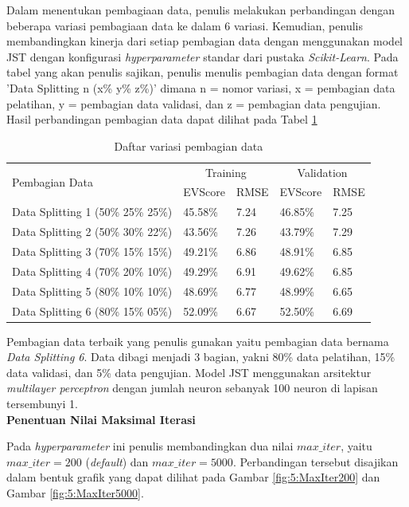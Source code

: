 Dalam menentukan pembagiaan data, penulis melakukan perbandingan dengan beberapa variasi pembagiaan data ke dalam 6 variasi. Kemudian, penulis membandingkan kinerja dari setiap pembagian data dengan menggunakan model JST dengan konfigurasi \textit{hyperparameter} standar dari pustaka \textit{Scikit-Learn}. Pada tabel yang akan penulis sajikan, penulis menulis pembagian data dengan format 'Data Splitting n (x\% y\% z\%)' dimana n = nomor variasi, x = pembagian data pelatihan, y = pembagian data validasi, dan z = pembagian data pengujian. Hasil perbandingan pembagian data dapat dilihat pada Tabel \ref{tbl:5:DataSplitting}
\begin{table}[!h]
	\caption{Daftar variasi pembagian data}
	\label{tbl:5:DataSplitting}
	\centering
	\begin{tabular}{|p{6cm}|p{1.5cm}|p{1cm}|p{1.5cm}|p{1cm}|}
		\hline
		\multirow{2}{*}{Pembagian Data } & \multicolumn{2}{|c|}{Training} & \multicolumn{2}{|c|}{Validation} \\
		\cline{2-5}	
		         & EVScore & RMSE & EVScore & RMSE \\
		\hline
		Data Splitting 1 (50\% 25\% 25\%) & 45.58\% & 7.24 & 46.85\% & 7.25 \\
		\hline
		Data Splitting 2 (50\% 30\% 22\%) & 43.56\% & 7.26 & 43.79\% & 7.29 \\
		\hline
		Data Splitting 3 (70\% 15\% 15\%) & 49.21\% & 6.86 & 48.91\% & 6.85 \\
		\hline
		Data Splitting 4 (70\% 20\% 10\%) & 49.29\% & 6.91 & 49.62\% & 6.85 \\
		\hline
		Data Splitting 5 (80\% 10\% 10\%) & 48.69\% & 6.77 & 48.99\% & 6.65 \\
		\hline
		Data Splitting 6 (80\% 15\% 05\%) & 52.09\% & 6.67 & 52.50\% & 6.69 \\
		\hline
	\end{tabular}
\end{table}

Pembagian data terbaik yang penulis gunakan yaitu pembagian data bernama \textit{Data Splitting 6}. Data dibagi menjadi 3 bagian, yakni 80\% data pelatihan, 15\% data validasi, dan 5\% data pengujian. Model JST menggunakan arsitektur \textit{multilayer perceptron} dengan jumlah neuron sebanyak 100 neuron di lapisan tersembunyi 1. \\

\noindent \textbf{Penentuan Nilai Maksimal Iterasi}

Pada \textit{hyperparameter} ini penulis membandingkan dua nilai $max\_iter$, yaitu $max\_iter = 200$ (\textit{default}) dan $max\_iter = 5000$. Perbandingan tersebut disajikan dalam bentuk grafik yang dapat dilihat pada Gambar \ref{fig:5:MaxIter200} dan Gambar \ref{fig:5:MaxIter5000}. \\

